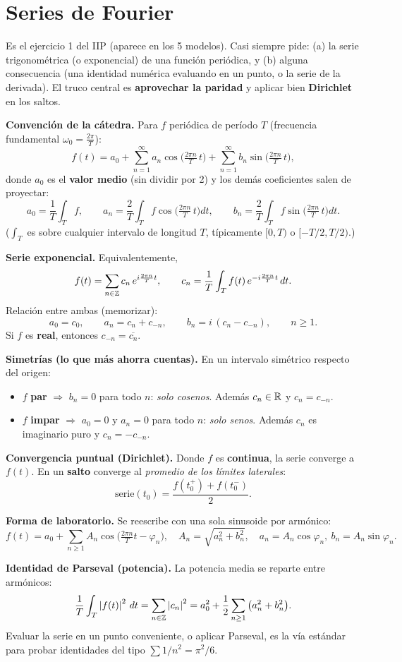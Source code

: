 \section{Series de Fourier}

Es el ejercicio 1 del IIP (aparece en los 5 modelos). Casi siempre pide: (a) la serie trigonométrica (o exponencial) de una función periódica, y (b) alguna consecuencia (una identidad numérica evaluando en un punto, o la serie de la derivada). El truco central es \textbf{aprovechar la paridad} y aplicar bien \textbf{Dirichlet} en los saltos.

\begin{teoria}
\textbf{Convención de la cátedra.} Para $f$ periódica de período $T$ (frecuencia fundamental $\omega_0=\frac{2\pi}{T}$):
\[
f(t)=a_0+\sum_{n=1}^{\infty}a_n\cos\!\Big(\tfrac{2\pi n}{T}\,t\Big)+\sum_{n=1}^{\infty}b_n\sin\!\Big(\tfrac{2\pi n}{T}\,t\Big),
\]
donde $a_0$ es el \textbf{valor medio} (sin dividir por 2) y los demás coeficientes salen de proyectar:
\[
a_0=\frac1T\int_T f,\qquad
a_n=\frac2T\int_T f\cos\!\Big(\tfrac{2\pi n}{T}\,t\Big)dt,\qquad
b_n=\frac2T\int_T f\sin\!\Big(\tfrac{2\pi n}{T}\,t\Big)dt.
\]
($\int_T$ es sobre cualquier intervalo de longitud $T$, típicamente $[0,T)$ o $[-T/2,T/2)$.)

\medskip
\textbf{Serie exponencial.} Equivalentemente,
\[
f(t)=\sum_{n\in\mathbb{Z}}c_n\,e^{i\frac{2\pi n}{T}t},\qquad
c_n=\frac1T\int_T f(t)\,e^{-i\frac{2\pi n}{T}t}\,dt.
\]
Relación entre ambas (memorizar):
\[
a_0=c_0,\qquad a_n=c_n+c_{-n},\qquad b_n=i\,(c_n-c_{-n}),\qquad n\ge1.
\]
Si $f$ es \textbf{real}, entonces $c_{-n}=\overline{c_n}$.

\medskip
\textbf{Simetrías (lo que más ahorra cuentas).} En un intervalo simétrico respecto del origen:
\begin{itemize}
\item $f$ \textbf{par} $\Rightarrow$ $b_n=0$ para todo $n$: \emph{solo cosenos}. Además $c_n\in\mathbb{R}$ y $c_n=c_{-n}$.
\item $f$ \textbf{impar} $\Rightarrow$ $a_0=0$ y $a_n=0$ para todo $n$: \emph{solo senos}. Además $c_n$ es imaginario puro y $c_n=-c_{-n}$.
\end{itemize}

\medskip
\textbf{Convergencia puntual (Dirichlet).} Donde $f$ es \textbf{continua}, la serie converge a $f(t)$. En un \textbf{salto} converge al \emph{promedio de los límites laterales}:
\[
\text{serie}(t_0)=\frac{f(t_0^{+})+f(t_0^{-})}{2}.
\]

\medskip
\textbf{Forma de laboratorio.} Se reescribe con una sola sinusoide por armónico:
\[
f(t)=a_0+\sum_{n\ge1}A_n\cos\!\Big(\tfrac{2\pi n}{T}t-\varphi_n\Big),\quad
A_n=\sqrt{a_n^2+b_n^2},\quad a_n=A_n\cos\varphi_n,\ b_n=A_n\sin\varphi_n.
\]

\medskip
\textbf{Identidad de Parseval (potencia).} La potencia media se reparte entre armónicos:
\[
\frac1T\int_T \left\lvert f(t) \right\rvert^2\,dt=\sum_{n\in\mathbb{Z}}\left\lvert c_n \right\rvert^2=a_0^2+\frac12\sum_{n\ge1}\big(a_n^2+b_n^2\big).
\]
Evaluar la serie en un punto conveniente, o aplicar Parseval, es la vía estándar para probar identidades del tipo $\sum 1/n^2=\pi^2/6$.
\end{teoria}


